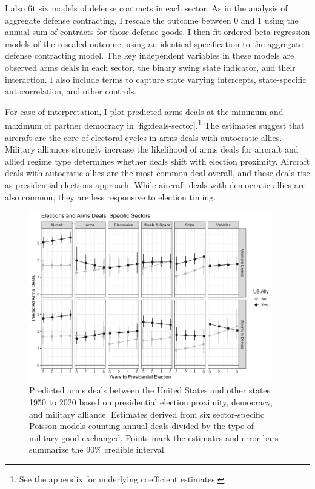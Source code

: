 \documentclass[12pt]{article}
\begin{document}
I also fit six models of defense contracts in each sector. 
As in the analysis of aggregate defense contracting, I rescale the outcome between 0 and 1 using the annual sum of contracts for those defense goods. 
I then fit ordered beta regression models of the rescaled outcome, using an identical specification to the aggregate defense contracting model.
The key independent variables in these models are observed arms deals in each sector, the binary swing state indicator, and their interaction. 
I also include terms to capture state varying intercepts, state-specific autocorrelation, and other controls. 


For ease of interpretation, I plot predicted arms deals at the minimum and maximum of partner democracy in \autoref{fig:deals-sector}.\footnote{See the appendix for underlying coefficient estimates.}
The estimates suggest that aircraft are the core of electoral cycles in arms deals with autocratic allies. 
Military alliances strongly increase the likelihood of arms deals for aircraft and allied regime type determines whether deals shift with election proximity. 
Aircraft deals with autocratic allies are the most common deal overall, and these deals rise as presidential elections approach. 
While aircraft deals with democratic allies are also common, they are less responsive to election timing. 



\begin{figure}[htpb]
	\centering
		\includegraphics[width=0.95\textwidth]{../figures/deals-sector.png}
	\caption{Predicted arms deals between the United States and other states 1950 to 2020 based on presidential election proximity, democracy, and military alliance. Estimates derived from six sector-specific Poisson models counting annual deals divided by the type of military good exchanged. Points mark the estimates and error bars summarize the 90\% credible interval.}
	\label{fig:deals-sector}
\end{figure}
\end{document}
